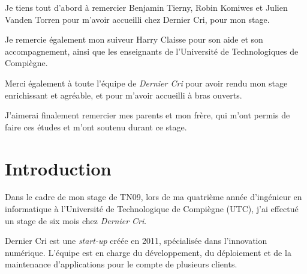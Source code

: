 \documentclass[12pt,a4paper]{article}
\begin{document}
  Je tiens tout d'abord à remercier Benjamin Tierny, Robin Komiwes et
  Julien Vanden Torren pour m'avoir accueilli chez Dernier Cri, pour mon
  stage.

  \bigskip

  Je remercie également mon suiveur Harry Claisse pour son aide et son
  accompagnement, ainsi que les enseignants de l'Université de
  Technologiques de Compiègne.

  \bigskip

  Merci également à toute l'équipe de \emph{Dernier Cri} pour avoir rendu
  mon stage enrichissant et agréable, et pour m'avoir accueilli à bras
  ouverts.

  \bigskip

  J'aimerai finalement remercier mes parents et mon frère, qui m'ont
  permis de faire ces études et m'ont soutenu durant ce stage.

  \newpage

  \section{Introduction}\label{introduction}

  \bigskip

  Dans le cadre de mon stage de TN09, lors de ma quatrième année
  d'ingénieur en informatique à l'Université de Technologique de Compiègne
  (UTC), j'ai effectué un stage de six mois chez \emph{Dernier Cri}.

  \bigskip

  Dernier Cri est une \emph{start-up} créée en 2011, spécialisée dans
  l'innovation numérique. L'équipe est en charge du développement, du
  déploiement et de la maintenance d'applications pour le compte de
  plusieurs clients.
\end{document}
